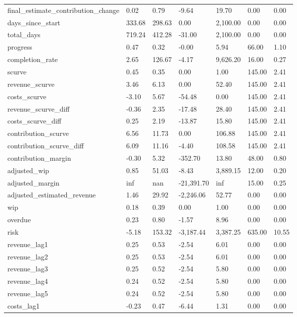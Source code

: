 \begin{landscape}
\begin{longtable}[h!]{lllllll}
final_estimate_contribution_change & 0.02 & 0.79 & -9.64 & 19.70 & 0.00 & 0.00 \\
days_since_start & 333.68 & 298.63 & 0.00 & 2,100.00 & 0.00 & 0.00 \\
total_days & 719.24 & 412.28 & -31.00 & 2,100.00 & 0.00 & 0.00 \\
progress & 0.47 & 0.32 & -0.00 & 5.94 & 66.00 & 1.10 \\
completion_rate & 2.65 & 126.67 & -4.17 & 9,626.20 & 16.00 & 0.27 \\
scurve & 0.45 & 0.35 & 0.00 & 1.00 & 145.00 & 2.41 \\
revenue_scurve & 3.46 & 6.13 & 0.00 & 52.40 & 145.00 & 2.41 \\
costs_scurve & -3.10 & 5.67 & -54.48 & 0.00 & 145.00 & 2.41 \\
revenue_scurve_diff & -0.36 & 2.35 & -17.48 & 28.40 & 145.00 & 2.41 \\
costs_scurve_diff & 0.25 & 2.19 & -13.87 & 15.80 & 145.00 & 2.41 \\
contribution_scurve & 6.56 & 11.73 & 0.00 & 106.88 & 145.00 & 2.41 \\
contribution_scurve_diff & 6.09 & 11.16 & -4.40 & 108.58 & 145.00 & 2.41 \\
contribution_margin & -0.30 & 5.32 & -352.70 & 13.80 & 48.00 & 0.80 \\
adjusted_wip & 0.85 & 51.03 & -8.43 & 3,889.15 & 12.00 & 0.20 \\
adjusted_margin & inf & nan & -21,391.70 & inf & 15.00 & 0.25 \\
adjusted_estimated_revenue & 1.46 & 29.92 & -2,246.06 & 52.77 & 0.00 & 0.00 \\
wip & 0.18 & 0.39 & 0.00 & 1.00 & 0.00 & 0.00 \\
overdue & 0.23 & 0.80 & -1.57 & 8.96 & 0.00 & 0.00 \\
risk & -5.18 & 153.32 & -3,187.44 & 3,387.25 & 635.00 & 10.55 \\
revenue_lag1 & 0.25 & 0.53 & -2.54 & 6.01 & 0.00 & 0.00 \\
revenue_lag2 & 0.25 & 0.53 & -2.54 & 6.01 & 0.00 & 0.00 \\
revenue_lag3 & 0.25 & 0.52 & -2.54 & 5.80 & 0.00 & 0.00 \\
revenue_lag4 & 0.24 & 0.52 & -2.54 & 5.80 & 0.00 & 0.00 \\
revenue_lag5 & 0.24 & 0.52 & -2.54 & 5.80 & 0.00 & 0.00 \\
costs_lag1 & -0.23 & 0.47 & -6.44 & 1.31 & 0.00 & 0.00 \\

\end{longtable}
\end{landscape}
